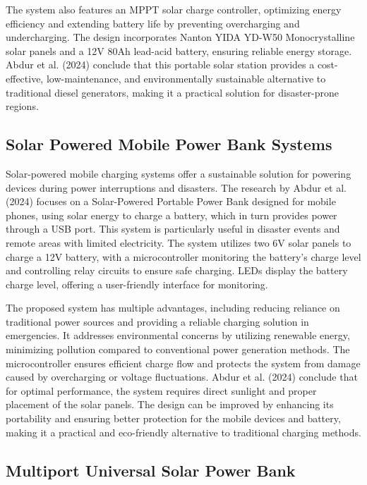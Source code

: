 {The system also features an MPPT solar charge controller, optimizing energy efficiency and extending battery life by preventing overcharging and undercharging. The design incorporates Nanton YIDA YD-W50 Monocrystalline solar panels and a 12V 80Ah lead-acid battery, ensuring reliable energy storage. Abdur et al. (2024) conclude that this portable solar station provides a cost-effective, low-maintenance, and environmentally sustainable alternative to traditional diesel generators, making it a practical solution for disaster-prone regions.

\subsection{Solar Powered Mobile Power Bank Systems}

Solar-powered mobile charging systems offer a sustainable solution for powering devices during power interruptions and disasters. The research by Abdur et al. (2024) focuses on a Solar-Powered Portable Power Bank designed for mobile phones, using solar energy to charge a battery, which in turn provides power through a USB port. This system is particularly useful in disaster events and remote areas with limited electricity. The system utilizes two 6V solar panels to charge a 12V battery, with a microcontroller monitoring the battery’s charge level and controlling relay circuits to ensure safe charging.  LEDs display the battery charge level, offering a user-friendly interface for monitoring.

The proposed system has multiple advantages, including reducing reliance on traditional power sources and providing a reliable charging solution in emergencies. It addresses environmental concerns by utilizing renewable energy, minimizing pollution compared to conventional power generation methods. The microcontroller ensures efficient charge flow and protects the system from damage caused by overcharging or voltage fluctuations. Abdur et al. (2024) conclude that for optimal performance, the system requires direct sunlight and proper placement of the solar panels. The design can be improved by enhancing its portability and ensuring better protection for the mobile devices and battery, making it a practical and eco-friendly alternative to traditional charging methods.

\subsection{Multiport Universal Solar Power Bank}

}
